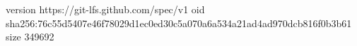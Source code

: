 version https://git-lfs.github.com/spec/v1
oid sha256:76c55d5407e46f78029d1ec0ed30c5a070a6a534a21ad4ad970dcb816f0b3b61
size 349692
